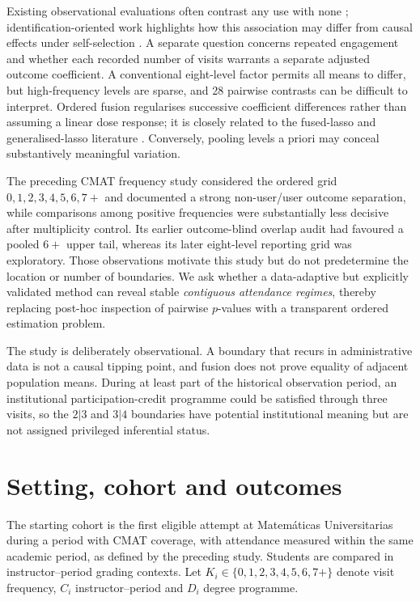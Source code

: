 \documentclass[11pt]{article}
\begin{document}
Existing observational evaluations often contrast any use with none \citep{macanbhaird2009,rickard2018,jacob2019}; identification-oriented work highlights how this association may differ from causal effects under self-selection \citep{paloyo2016,pugatch2018,buchele2024}. A separate question concerns repeated engagement and whether each recorded number of visits warrants a separate adjusted outcome coefficient. A conventional eight-level factor permits all means to differ, but high-frequency levels are sparse, and 28 pairwise contrasts can be difficult to interpret. Ordered fusion regularises successive coefficient differences rather than assuming a linear dose response; it is closely related to the fused-lasso and generalised-lasso literature \citep{tibshirani2005fused,tibshirani2011generalized}. Conversely, pooling levels a priori may conceal substantively meaningful variation.

The preceding CMAT frequency study considered the ordered grid $0,1,2,3,4,5,6,7+$ and documented a strong non-user/user outcome separation, while comparisons among positive frequencies were substantially less decisive after multiplicity control. Its earlier outcome-blind overlap audit had favoured a pooled $6+$ upper tail, whereas its later eight-level reporting grid was exploratory. Those observations motivate this study but do not predetermine the location or number of boundaries. We ask whether a data-adaptive but explicitly validated method can reveal stable \emph{contiguous attendance regimes}, thereby replacing post-hoc inspection of pairwise $p$-values with a transparent ordered estimation problem.

The study is deliberately observational. A boundary that recurs in administrative data is not a causal tipping point, and fusion does not prove equality of adjacent population means. During at least part of the historical observation period, an institutional participation-credit programme could be satisfied through three visits, so the $2|3$ and $3|4$ boundaries have potential institutional meaning but are not assigned privileged inferential status.

\section{Setting, cohort and outcomes}
The starting cohort is the first eligible attempt at Matem\'aticas Universitarias during a period with CMAT coverage, with attendance measured within the same academic period, as defined by the preceding study. Students are compared in instructor--period grading contexts. Let $K_i\in\{0,1,2,3,4,5,6,7+\}$ denote visit frequency, $C_i$ instructor--period and $D_i$ degree programme.
\end{document}
